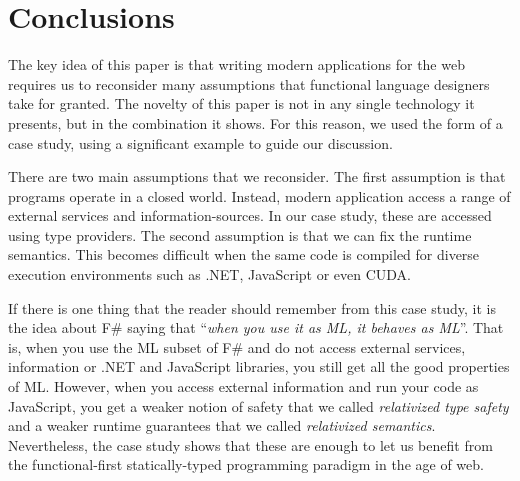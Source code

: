 \documentclass[submission,copyright,creativecommons]{eptcs}
\begin{document}

\section{Conclusions}

The key idea of this paper is that writing modern applications for the web requires us to
reconsider many assumptions that functional language designers take for granted. The novelty
of this paper is not in any single technology it presents, but in the combination it shows.
For this reason, we used the form of a case study, using a significant example to guide our
discussion.

\newpage
There are two main assumptions that we reconsider. The first assumption is that programs
operate in a closed world. Instead, modern application access a range of external services
and information-sources. In our case study, these are accessed using type providers.
The second assumption is that we can fix the runtime semantics. This becomes difficult when
the same code is compiled for diverse execution environments such as .NET, JavaScript or
even CUDA.

If there is one thing that the reader should remember from this case study, it is the
idea about F\# saying that ``\emph{when you use it as ML, it behaves as ML}''. That is, when
you use the ML subset of F\# and do not access external services, information or .NET and
JavaScript libraries, you still get all the good properties of ML. However, when you access
external information and run your code as JavaScript, you get a weaker notion of safety that
we called \emph{relativized type safety} and a weaker runtime guarantees that we called
\emph{relativized semantics}. Nevertheless, the case study shows that these are enough to
let us benefit from the functional-first statically-typed programming paradigm in the age of web.


\nocite{*}


\end{document}
